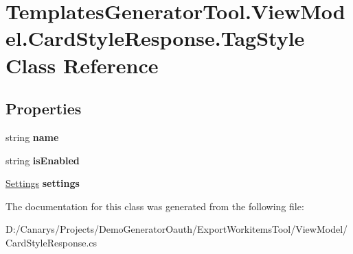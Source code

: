 \hypertarget{class_templates_generator_tool_1_1_view_model_1_1_card_style_response_1_1_tag_style}{}\section{Templates\+Generator\+Tool.\+View\+Model.\+Card\+Style\+Response.\+Tag\+Style Class Reference}
\label{class_templates_generator_tool_1_1_view_model_1_1_card_style_response_1_1_tag_style}
\subsection*{Properties}
\begin{DoxyCompactItemize}
\item 
\mbox{\label{class_templates_generator_tool_1_1_view_model_1_1_card_style_response_1_1_tag_style_a1a115d85ef59bf93f3e7464d70db7390}} 
string {\bfseries name}
\item 
\mbox{\label{class_templates_generator_tool_1_1_view_model_1_1_card_style_response_1_1_tag_style_a7093c8f25bbe04f9810d91c00fbfdddf}} 
string {\bfseries is\+Enabled}
\item 
\mbox{\label{class_templates_generator_tool_1_1_view_model_1_1_card_style_response_1_1_tag_style_aaedd930603c51c34dc3363ae9eb716f5}} 
\mbox{\hyperlink{class_templates_generator_tool_1_1_view_model_1_1_card_style_response_1_1_settings}{Settings}} {\bfseries settings}
\end{DoxyCompactItemize}


The documentation for this class was generated from the following file\+:\begin{DoxyCompactItemize}
\item 
D\+:/\+Canarys/\+Projects/\+Demo\+Generator\+Oauth/\+Export\+Workitems\+Tool/\+View\+Model/Card\+Style\+Response.\+cs\end{DoxyCompactItemize}
